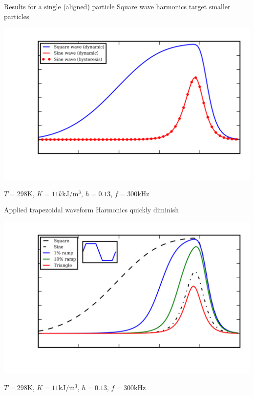 \documentclass{sotonbeamer}
\begin{document}
\begin{frame}{Results for a single (aligned) particle}
Square wave harmonics target smaller particles
  \begin{center}
    \includegraphics{figures/sineVsquare.png}
  \end{center}
\vspace{-3mm}
  {\tiny $T=298$K, $K=11k$kJ/m$^3$, $h=0.13$, $f=300$kHz}
\end{frame}

\begin{frame}{Applied trapezoidal waveform}
Harmonics quickly diminish
  \begin{center}
    \includegraphics{figures/trap.png}
  \end{center}
\vspace{-3mm}
{\tiny $T=298$K, $K=11$kJ/m$^3$, $h=0.13$, $f=300$kHz}
\end{frame}
\end{document}
